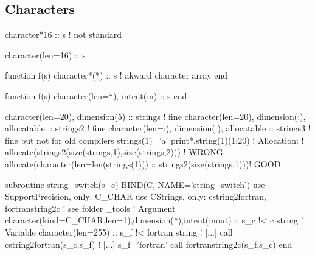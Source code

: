 \documentclass{article}
\begin{document}
\subsection{Characters}
\label{sec:characters}
\begin{codea}
character*16 :: s ! not standard
\end{codea} 
\begin{codeb}
character(len=16) :: s
\end{codeb}
\begin{codea}
function f(s)
  character*(*) :: s ! akward character array
end
\end{codea} 
\begin{codeb}
function f(s)
  character(len=*), intent(in) :: s
end
\end{codeb}

\begin{codefull}
character(len=20), dimension(5)              :: strings  ! fine
character(len=20), dimension(:), allocatable :: strings2 ! fine 
character(len=:),  dimension(:), allocatable :: strings3 ! fine but not for old compilers
strings(1)='a'
print*,string(1)(1:20)
! Allocation: 
! allocate(strings2(size(strings,1),size(strings,2)))                ! WRONG
allocate(character(len=len(strings(1))) :: strings2(size(strings,1)))! GOOD
\end{codefull}\par 
\begin{codefull}
subroutine string_switch(s_c) BIND(C, NAME='string_switch')
    use SupportPrecision, only: C_CHAR
    use CStrings,         only: cstring2fortran, fortranstring2c ! see folder _tools
    ! Argument
    character(kind=C_CHAR,len=1),dimension(*),intent(inout) :: s_c !< c string
    ! Variable
    character(len=255) :: s_f   !< fortran string
    ! [...]
    call cstring2fortran(s_c,s_f)
    ! [...]
    s_f='fortran'
    call fortranstring2c(s_f,s_c)
end 
\end{codefull}


\end{document}
